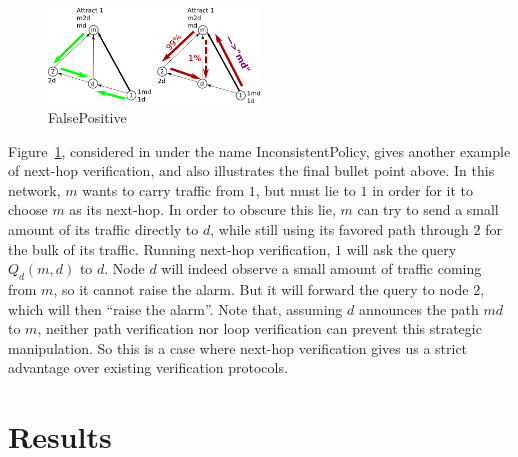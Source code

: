 \documentclass[pdftex,twoside,twocolumn,10pt,letterpaper]{article}
\newtheorem{lemma}{Lemma}
\begin{document}
  \begin{figure}[h]
    \centering
    \caption{FalsePositive}\label{fig:FalsePositive}
    \includegraphics[width=0.5\textwidth]{Inconsistent}
  \end{figure}

  Figure~\ref{fig:FalsePositive}, considered in \cite{Attraction} under the name
  Inconsistent\-Policy, gives another example of next-hop verification,
  and also illustrates the final bullet point above. In this network, $m$ wants
  to carry traffic from $1$, but must lie to $1$ in order for it to choose $m$
  as its next-hop. In order to obscure this lie, $m$ can try to send a small
  amount of its traffic directly to $d$, while still using its favored path
  through $2$ for the bulk of its traffic.
  Running next-hop verification, $1$ will ask the query
  $Q_d(m,d)$ to $d$. Node $d$ will indeed observe a small amount of traffic
  coming from $m$, so it cannot raise the alarm.
  But it will forward the query to node $2$, which will then ``raise the
  alarm''. Note that, assuming $d$ announces the path $md$ to $m$,
  neither path verification nor loop verification can prevent this strategic
  manipulation. So this is a case where next-hop verification gives us a strict
  advantage over existing verification protocols.


\section{Results}

\end{document}

